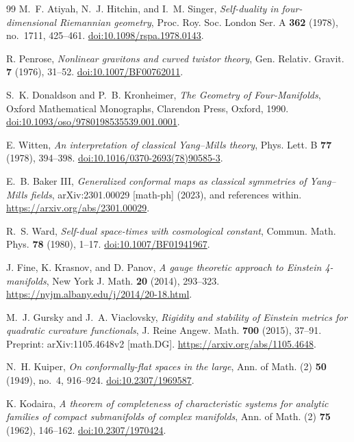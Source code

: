 \documentclass[11pt]{article}
\numberwithin{equation}{section}
\theoremstyle{definition}
\theoremstyle{remark}
\begin{document}
\begin{thebibliography}{99}
M.~F. Atiyah, N.~J. Hitchin, and I.~M. Singer,
\emph{Self-duality in four-dimensional Riemannian geometry},
Proc. Roy. Soc. London Ser. A \textbf{362} (1978), no.~1711, 425--461.
\href{https://doi.org/10.1098/rspa.1978.0143}{doi:10.1098/rspa.1978.0143}.

R. Penrose,
\emph{Nonlinear gravitons and curved twistor theory},
Gen. Relativ. Gravit. \textbf{7} (1976), 31--52.
\href{https://doi.org/10.1007/BF00762011}{doi:10.1007/BF00762011}.

S.~K. Donaldson and P.~B. Kronheimer,
\emph{The Geometry of Four-Manifolds},
Oxford Mathematical Monographs,
Clarendon Press, Oxford, 1990.
\href{https://doi.org/10.1093/oso/9780198535539.001.0001}{doi:10.1093/oso/9780198535539.001.0001}.

E. Witten,
\emph{An interpretation of classical Yang--Mills theory},
Phys. Lett. B \textbf{77} (1978), 394--398.
\href{https://doi.org/10.1016/0370-2693(78)90585-3}{doi:10.1016/0370-2693(78)90585-3}.

E.~B. Baker III,
\emph{Generalized conformal maps as classical symmetries of Yang--Mills fields},
arXiv:2301.00029 [math-ph] (2023), and references within.
\url{https://arxiv.org/abs/2301.00029}.

R.~S. Ward,
\emph{Self-dual space-times with cosmological constant},
Commun. Math. Phys. \textbf{78} (1980), 1--17.
\href{https://doi.org/10.1007/BF01941967}{doi:10.1007/BF01941967}.

J. Fine, K. Krasnov, and D. Panov,
\emph{A gauge theoretic approach to Einstein 4-manifolds},
New York J. Math. \textbf{20} (2014), 293--323.
\url{https://nyjm.albany.edu/j/2014/20-18.html}.

M.~J. Gursky and J.~A. Viaclovsky,
\emph{Rigidity and stability of Einstein metrics for quadratic curvature functionals},
J. Reine Angew. Math. \textbf{700} (2015), 37--91.
Preprint: arXiv:1105.4648v2 [math.DG].
\url{https://arxiv.org/abs/1105.4648}.

N.~H. Kuiper,
\emph{On conformally-flat spaces in the large},
Ann. of Math. (2) \textbf{50} (1949), no.~4, 916--924.
\href{https://doi.org/10.2307/1969587}{doi:10.2307/1969587}.

K. Kodaira,
\emph{A theorem of completeness of characteristic systems for analytic
families of compact submanifolds of complex manifolds},
Ann. of Math. (2) \textbf{75} (1962), 146--162.
\href{https://doi.org/10.2307/1970424}{doi:10.2307/1970424}.


\end{thebibliography}
\end{document}
